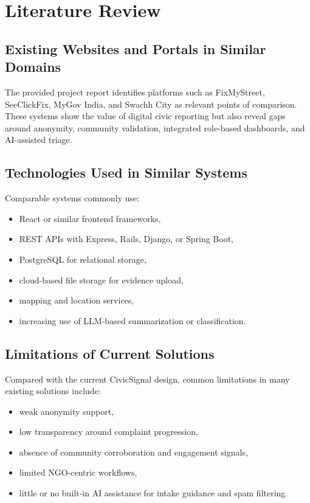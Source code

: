 \documentclass[12pt,a4paper]{report}
\begin{document}
\chapter{Literature Review}
\section{Existing Websites and Portals in Similar Domains}
The provided project report identifies platforms such as FixMyStreet, SeeClickFix, MyGov India, and Swachh City as relevant points of comparison. These systems show the value of digital civic reporting but also reveal gaps around anonymity, community validation, integrated role-based dashboards, and AI-assisted triage.

\section{Technologies Used in Similar Systems}
Comparable systems commonly use:
\begin{itemize}
  \item React or similar frontend frameworks,
  \item REST APIs with Express, Rails, Django, or Spring Boot,
  \item PostgreSQL for relational storage,
  \item cloud-based file storage for evidence upload,
  \item mapping and location services,
  \item increasing use of LLM-based summarization or classification.
\end{itemize}

\section{Limitations of Current Solutions}
Compared with the current CivicSignal design, common limitations in many existing solutions include:
\begin{itemize}
  \item weak anonymity support,
  \item low transparency around complaint progression,
  \item absence of community corroboration and engagement signals,
  \item limited NGO-centric workflows,
  \item little or no built-in AI assistance for intake guidance and spam filtering.
\end{itemize}
\end{document}
